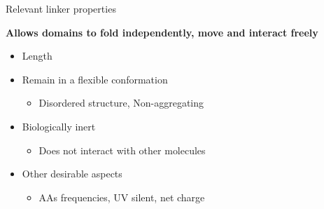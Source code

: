 \documentclass{beamer}
\begin{document}
\begin{frame}{Relevant linker properties}
\vspace{-20px}
\begin{adjustwidth}{-0.5em}{-1.5em}
\textbf{Allows domains to fold independently, move and interact freely}
 \end{adjustwidth}

 \vspace{10px}

\begin{itemize}
  \item Length
  \item Remain in a flexible conformation  %
    \begin{itemize}
     \item Disordered structure, Non-aggregating
    \end{itemize}

  \item Biologically inert  %
    \begin{itemize}
     \item Does not interact with other molecules
    \end{itemize}

  \item Other desirable aspects  %
    \begin{itemize}
     \item AAs frequencies, UV silent, net charge
    \end{itemize}
\end{itemize}


\end{frame}
\end{document}
